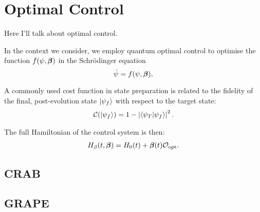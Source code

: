 \chapter{Optimal Control}

Here I'll talk about optimal control.

In the context we consider,  we employ quantum optimal control to optimise the function $f(\psi,\boldsymbol{\beta})$ in the Schr\"odinger equation
\begin{equation}
\dot{\psi} = f(\psi,\boldsymbol{\beta}),
\label{eq:control_schroedinger}
\end{equation}

A commonly used cost function in state preparation is related  to the fidelity of the final, post-evolution state $\ket{\psi_f}$ with respect to the target state:
\begin{align} \label{eq:lossfunc}
    \mathcal{C}(\ket{\psi_f}) = 1 - \left|\braket{\psi_T}{\psi_f}\right|^2.
\end{align}

The full Hamiltonian of the control system is then:
\begin{align} \label{eq:h_optimal_control}
    H_{\beta}(t,\boldsymbol{\beta})  = H_0(t) + \boldsymbol{\beta}(t)\mathcal{O}_{\rm opt}.
\end{align}

    \section{CRAB}
    \section{GRAPE}